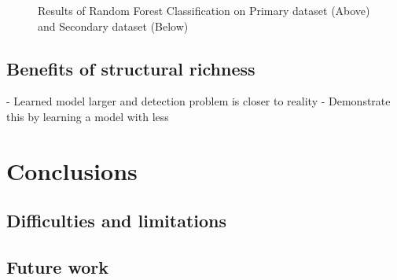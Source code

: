 \documentclass[sigconf]{acmart}
\begin{document}
\begin{figure}%



\caption{Results of Random Forest Classification on Primary dataset (Above) and Secondary dataset (Below)}
\label{Fig:Primary}
\end{figure}



\subsection{Benefits of structural richness}


- Learned model larger and detection problem is closer to reality
- Demonstrate this by learning a model with less


\section{Conclusions}\label{Sec:Conclusion}



\subsection{Difficulties and limitations}


\subsection{Future work}
\end{document}
